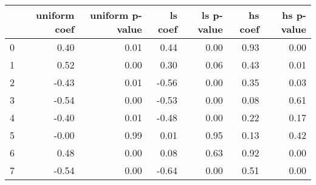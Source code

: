 \begin{tabular}{lrrrrrr}
\toprule
 & uniform coef & uniform p-value & ls coef & ls p-value & hs coef & hs p-value \\
\midrule
0 & 0.40 & 0.01 & 0.44 & 0.00 & 0.93 & 0.00 \\
1 & 0.52 & 0.00 & 0.30 & 0.06 & 0.43 & 0.01 \\
2 & -0.43 & 0.01 & -0.56 & 0.00 & 0.35 & 0.03 \\
3 & -0.54 & 0.00 & -0.53 & 0.00 & 0.08 & 0.61 \\
4 & -0.40 & 0.01 & -0.48 & 0.00 & 0.22 & 0.17 \\
5 & -0.00 & 0.99 & 0.01 & 0.95 & 0.13 & 0.42 \\
6 & 0.48 & 0.00 & 0.08 & 0.63 & 0.92 & 0.00 \\
7 & -0.54 & 0.00 & -0.64 & 0.00 & 0.51 & 0.00 \\
\bottomrule
\end{tabular}
